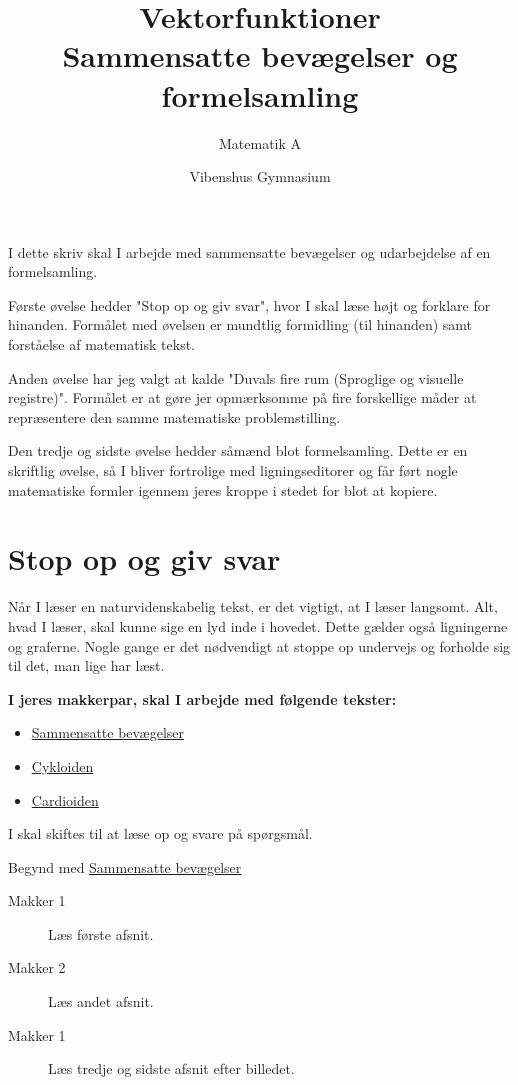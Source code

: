 \documentclass[a4paper, 12pt]{article}
\author{Matematik A}
\date{Vibenshus Gymnasium}
\title{Vektorfunktioner\\\medskip
\large Sammensatte bevægelser og formelsamling}
\begin{document}
\maketitle
I dette skriv skal I arbejde med sammensatte bevægelser og udarbejdelse af en formelsamling. 

Første øvelse hedder "Stop op og giv svar", hvor I skal læse højt og forklare for hinanden. Formålet med øvelsen er mundtlig formidling (til hinanden) samt forståelse af matematisk tekst. 

Anden øvelse har jeg valgt at kalde "Duvals fire rum (Sproglige og visuelle registre)". Formålet er at gøre jer opmærksomme på fire forskellige måder at repræsentere den samme matematiske problemstilling. 

Den tredje og sidste øvelse hedder såmænd blot formelsamling. Dette er en skriftlig øvelse, så I bliver fortrolige med ligningseditorer og får ført nogle matematiske formler igennem jeres kroppe i stedet for blot at kopiere.

\section*{Stop op og giv svar}
\label{sec:orga24acba}

Når I læser en naturvidenskabelig tekst, er det vigtigt, at I læser langsomt. Alt, hvad I læser, skal kunne sige en lyd inde i hovedet. Dette gælder også ligningerne og graferne. Nogle gange er det nødvendigt at stoppe op undervejs og forholde sig til det, man lige har læst.

\textbf{I jeres makkerpar, skal I arbejde med følgende tekster:}

\begin{itemize}
\item \href{https://mathtxa.systime.dk/?id=365}{Sammensatte bevægelser}
\item \href{https://mathtxa.systime.dk/?id=p366}{Cykloiden}
\item \href{https://mathtxa.systime.dk/?id=p367}{Cardioiden}
\end{itemize}

I skal skiftes til at læse op og svare på spørgsmål.

Begynd med \href{https://mathtxa.systime.dk/?id=365}{Sammensatte bevægelser}

\begin{description}
\item[{Makker 1}] Læs første afsnit.

\item[{Makker 2}] Læs andet afsnit.

\item[{Makker 1}] Læs tredje og sidste afsnit efter billedet.
\end{description}
\end{document}
